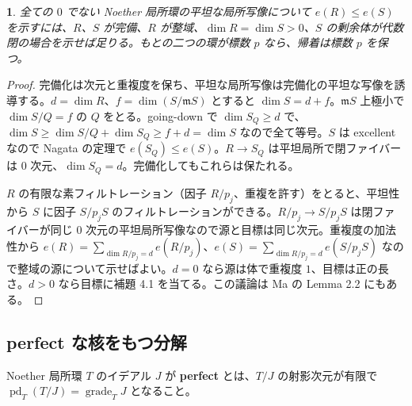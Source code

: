 \documentclass[11pt,a4paper]{ltjsarticle}
\newcommand{\stmtname}{}
\theoremstyle{plain}
\newtheorem*{stmtgen}{\stmtname}
\newenvironment{stmt}[1]{\renewcommand{\stmtname}{#1}\begin{stmtgen}}{\end{stmtgen}}
\theoremstyle{definition}
\newcommand{\m}{\mathfrak{m}}
\newcommand{\pd}{\operatorname{pd}}
\newcommand{\grade}{\operatorname{grade}}
\begin{document}
\begin{stmt}{補題 4.2}
全ての $0$ でない Noether 局所環の平坦な局所写像について $e(R)\le e(S)$ を示すには、$R$、$S$ が完備、$R$ が整域、$\dim R = \dim S>0$、$S$ の剰余体が代数閉の場合を示せば足りる。もとの二つの環が標数 $p$ なら、帰着は標数 $p$ を保つ。
\end{stmt}
\begin{proof}
完備化は次元と重複度を保ち、平坦な局所写像は完備化の平坦な写像を誘導する。$d = \dim R$、$f = \dim(S/\m S)$ とすると $\dim S = d+f$。$\m S$ 上極小で $\dim S/Q = f$ の $Q$ をとる。going-down で $\dim S_Q\ge d$ で、$\dim S\ge\dim S/Q+\dim S_Q\ge f+d = \dim S$ なので全て等号。$S$ は excellent なので Nagata の定理で $e(S_Q)\le e(S)$。$R\to S_Q$ は平坦局所で閉ファイバーは $0$ 次元、$\dim S_Q = d$。完備化してもこれらは保たれる。

$R$ の有限な素フィルトレーション（因子 $R/p_j$、重複を許す）をとると、平坦性から $S$ に因子 $S/p_jS$ のフィルトレーションができる。$R/p_j\to S/p_jS$ は閉ファイバーが同じ $0$ 次元の平坦局所写像なので源と目標は同じ次元。重複度の加法性から
$e(R) = \sum_{\dim R/p_j = d}e(R/p_j)$、$e(S) = \sum_{\dim R/p_j = d}e(S/p_jS)$
なので整域の源について示せばよい。$d = 0$ なら源は体で重複度 $1$、目標は正の長さ。$d>0$ なら目標に補題 4.1 を当てる。この議論は Ma の Lemma 2.2 にもある。
\end{proof}

\subsection{perfect な核をもつ分解}
Noether 局所環 $T$ のイデアル $J$ が \textbf{perfect} とは、$T/J$ の射影次元が有限で $\pd_T(T/J) = \grade_TJ$ となること。
\end{document}
